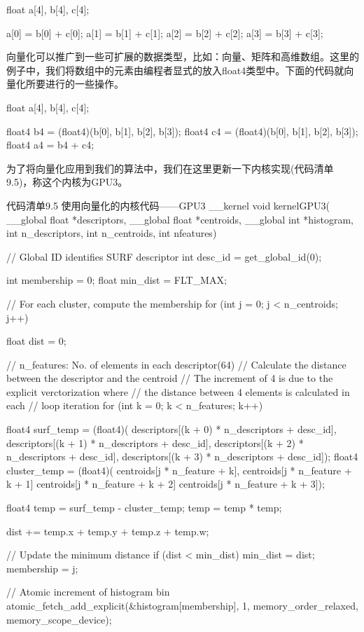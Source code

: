 \begin{codebox}[cpp]
float a[4], b[4], c[4];

a[0] = b[0] + c[0];
a[1] = b[1] + c[1];
a[2] = b[2] + c[2];
a[3] = b[3] + c[3];
\end{codebox}

向量化可以推广到一些可扩展的数据类型，比如：向量、矩阵和高维数组。这里的例子中，我们将数组中的元素由编程者显式的放入float4类型中。下面的代码就向量化所要进行的一些操作。

\begin{codebox}[cpp]
float a[4], b[4], c[4];

float4 b4 = (float4)(b[0], b[1], b[2], b[3]);
float4 c4 = (float4)(b[0], b[1], b[2], b[3]);
float4 a4 = b4 + c4;
\end{codebox}

为了将向量化应用到我们的算法中，我们在这里更新一下内核实现(代码清单9.5)，称这个内核为GPU3。

\begin{codeboxt}[cpp]{代码清单9.5 使用向量化的内核代码——GPU3}
__kernel
void kernelGPU3(
  __global float *descriptors,
  __global float *centroids,
  __global int *histogram,
  int n_descriptors,
  int n_centroids,
  int nfeatures){

  // Global ID identifies SURF descriptor
  int desc_id = get_global_id(0);

  int membership = 0;
  float min_dist = FLT_MAX;

  // For each cluster, compute the membership
  for (int j = 0; j < n_centroids; j++){
    float dist = 0;

    // n_features: No. of elements in each descriptor(64)
    // Calculate the distance between the descriptor and the centroid
    // The increment of 4 is due to the explicit verctorization where
    // the distance between 4 elements is calculated in each
    // loop iteration
    for (int k = 0; k < n_features; k++){
      float4 surf_temp = (float4)(
        descriptors[(k + 0) * n_descriptors + desc_id],
        descriptors[(k + 1) * n_descriptors + desc_id],
        descriptors[(k + 2) * n_descriptors + desc_id],
        descriptors[(k + 3) * n_descriptors + desc_id]);
      float4 cluster_temp = (float4)(
        centroids[j * n_feature + k],
        centroids[j * n_feature + k + 1]
        centroids[j * n_feature + k + 2]
        centroids[j * n_feature + k + 3]);

      float4 temp = surf_temp - cluster_temp;
      temp = temp * temp;

      dist += temp.x + temp.y + temp.z + temp.w;
    }

    // Update the minimum distance
    if (dist < min_dist){
      min_dist = dist;
      membership = j;
    }
  }

  // Atomic increment of histogram bin
  atomic_fetch_add_explicit(&histogram[membership], 1, memory_order_relaxed, memory_scope_device);
}
\end{codeboxt}

